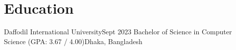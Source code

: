 \section{Education}
    \resumeSubHeadingListStart

    \resumeSubheading
    {Daffodil International University}{Sept 2023}
    {Bachelor of Science in Computer Science (GPA: 3.67 / 4.00)}{Dhaka, Bangladesh}
    \resumeSubHeadingListEnd